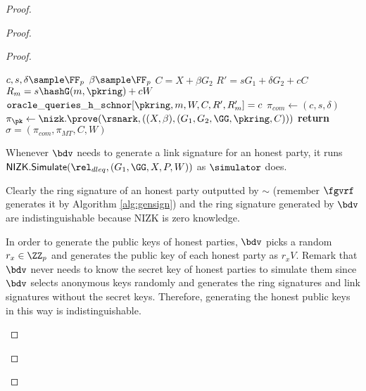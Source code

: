 \begin{proof}
\begin{proof}
\begin{proof}
			
			\begin{algorithm}
				\caption{$\gen_{sign}(\pkring,W,X,m)$}
				\label{alg:gensignbdv}	 	
				\begin{algorithmic}[1]
					\State $ c,s,\delta \sample \FF_p $
					\State $ \beta \sample \FF_p $
					\State $ C =  X + \beta G_2$
					\State $ R' = sG_1 +\delta G_2 + cC$
					\State $ R_m = s\hashG(m, \pkring) + c W $
					\State $ \mathtt{oracle\_queries\_h\_schnor}[\pkring,m, W, C,R',R'_m] = c$						
					\State $ \pi_{com} \leftarrow (c,s,\delta) $
					\State $ \pi_{\pk} \leftarrow  \nizk.\prove(\rsnark,((X, \beta),(G_1,G_2, \GG,\pkring, C))) $
					\State \textbf{return} $ \sigma = (\pi_{com},\pi_{MT},C,W) $
				\end{algorithmic}
				
			\end{algorithm}
			
			Whenever $ \bdv $ needs to generate a link signature for an honest party, it runs $ \mathsf{NIZK}.\mathsf{Simulate}(\rel_{dleq},(G_1,\GG, X,P,W)) $ as $ \simulator $ does.
			
			Clearly the ring signature of an honest party outputted by $ \sim $ (remember $ \fgvrf$ generates it by Algorithm \ref{alg:gensign}) and the ring signature generated by $ \bdv $ are indistinguishable because NIZK is zero knowledge.
			
			In order to generate the public keys of honest parties, $ \bdv $ picks a random $ r_x\in \ZZ_p $ and generates the public key of each honest party as $ r_xV$.
			Remark that $ \bdv$  never needs to know the secret key of honest parties to simulate them since $ \bdv $ selects anonymous keys randomly  and generates the ring signatures and link signatures  without the secret keys. Therefore, generating the honest public keys in this way is indistinguishable. 			
			\begin{figure}
				\centering
				
				\noindent{}
\end{figure}
\end{proof}
\end{proof}
\end{proof}
